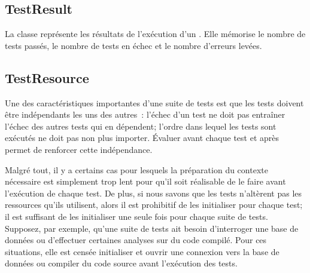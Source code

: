 \documentclass[a4paper,10pt,twoside]{book}
\begin{document}
\subsection{TestResult}

La classe  représente les résultats de l'exécution d'un . Elle mémorise le nombre de tests passés, le nombre de tests en échec et le nombre d'erreurs levées.

\subsection{TestResource}

Une des caractéristiques importantes d'une suite de tests est que les tests doivent être indépendants les uns des autres~: l'échec d'un test ne doit pas entraîner l'échec des autres tests qui en dépendent; l'ordre dans lequel les tests sont exécutés ne doit pas non plus importer.
Évaluer   avant chaque test et  après permet de renforcer cette indépendance.

Malgré tout, il y a certains cas pour lesquels la préparation du contexte nécessaire est simplement trop lent pour qu'il soit 
réalisable
de le faire avant l'exécution de chaque test. De plus, si nous savons que les tests n'altèrent pas les ressources qu'ils utilisent, alors il est prohibitif de les initialiser pour chaque test; il est suffisant de les initialiser une seule fois pour chaque suite de tests. Supposez, par exemple, qu'une suite de tests ait besoin d'interroger une base de données ou d'effectuer certaines analyses sur du code compilé.
Pour ces situations, elle est censée initialiser et ouvrir une
connexion vers la base de données ou compiler du code source avant
l'exécution des tests.
\end{document}
